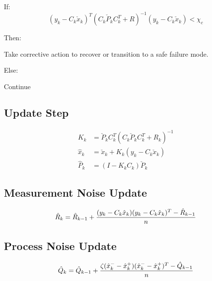 \documentclass[a4paper]{article}
\begin{document}
	If:
	\begin{equation*}
		(y_k - C_k \check{x}_k)^T (C_k \check{P}_k C_k^T + R)^{-1} (y_k - C_k \check{x}_k) < \chi_c
	\end{equation*}

	Then:
		\begin{center}
			Take corrective action to recover or transition to a safe failure mode.
		\end{center}

	Else:
		\begin{center}
			Continue
		\end{center}

	\subsection{Update Step}
	\begin{align*}
		K_k &=  \check{P}_k C_k^T (C_k \check{P}_k C_k^T + R_k)^{-1} \\
		\hat{x}_k &= \check{x}_k + K_k (y_k - C_k \check{x}_k) \\
		\hat{P}_k &= (I - K_k C_k) \check{P}_k
	\end{align*}

	\subsection{Measurement Noise Update}

	\begin{equation*}
		\hat{R}_k = \hat{R}_{k-1} + {(y_k - C_k \hat{x}_k)(y_k - C_k \hat{x}_k)^T - \hat{R}_{k-1} \over n}
	\end{equation*}

	\subsection{Process Noise Update}

	\begin{equation*}
		\hat{Q}_k = \hat{Q}_{k-1} + {\zeta (\hat{x}_k^- - \hat{x}_k^+)(\hat{x}_k^- - \hat{x}_k^+)^T - \hat{Q}_{k-1} \over n}
	\end{equation*}

\printbibliography[title={References}]
\end{document}
